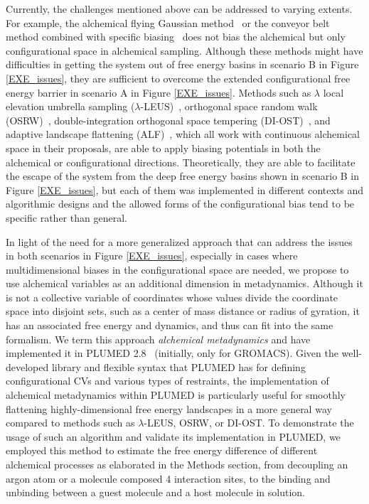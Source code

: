 \documentclass[journal=jacsat,manuscript=article]{achemso}
\begin{document}
Currently, the challenges mentioned above can be addressed to varying extents. For example, the alchemical flying Gaussian method~\cite{trapl2020prediction} or the conveyor belt method combined with specific biasing~\cite{hahn2020overcoming} does not bias the alchemical but only configurational space in alchemical sampling. Although these methods might have difficulties in getting the system out of free energy basins in scenario B in Figure \ref{EXE_issues}, they are sufficient to overcome the extended configurational free energy barrier in scenario A in Figure \ref{EXE_issues}. Methods such as $\lambda$ local elevation umbrella sampling ($\lambda$-LEUS)~\cite{bieler2014local, bieler2015multistate}, orthogonal space random walk (OSRW)~\cite{zheng2008random}, double-integration orthogonal space tempering (DI-OST)~\cite{zheng2012practically}, and adaptive landscape flattening (ALF)~\cite{hayes2017adaptive}, which all work with continuous alchemical space in their proposals, are able to 
apply biasing potentials in both the alchemical or configurational directions. Theoretically, they are able to facilitate the escape of the system from the deep free energy basins shown in scenario B in Figure \ref{EXE_issues}, but each of them was implemented in different contexts and algorithmic designs and the allowed forms of the configurational bias tend to be specific rather than general. 

In light of the need for a more generalized approach that can address the issues in both scenarios in Figure \ref{EXE_issues}, especially in cases where multidimensional biases in the configurational space are needed, we propose to use alchemical variables as an additional dimension in metadynamics. Although it is not a collective variable of coordinates whose values divide the coordinate space into disjoint sets, such as a center of mass distance or radius of gyration, it has an associated free energy and dynamics, and thus can fit into the same formalism.  We term this approach \textit{alchemical metadynamics} and have implemented it in PLUMED 2.8~\cite{tribello2014plumed} (initially, only for GROMACS). Given the well-developed library and flexible syntax that PLUMED has for defining configurational CVs and various types of restraints, the implementation of alchemical metadynamics within PLUMED is particularly useful for smoothly flattening highly-dimensional free energy landscapes in a more general way compared to methods such as $\lambda$-LEUS, OSRW, or DI-OST. To demonstrate the usage of such an algorithm and validate its implementation in PLUMED, we employed this method to estimate the free energy difference of different alchemical processes as elaborated in the Methods section, from decoupling an argon atom or a molecule composed 4 interaction sites, to the binding and unbinding between a guest molecule and a host molecule in solution. 
\end{document}
